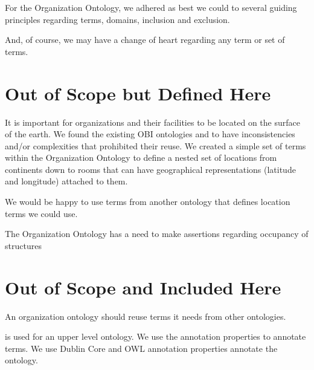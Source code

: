\documentclass[letterpaper,10pt,english]{sphinxmanual}
\begin{document}
\sphinxAtStartPar
For the Organization Ontology, we adhered as best we could to several guiding principles
regarding terms, domains, inclusion and exclusion.

\sphinxAtStartPar
And, of course, we may have a change of heart regarding any term or set of terms.


\section{Out of Scope but Defined Here}
\label{\detokenize{out-of-scope:out-of-scope-but-defined-here}}
\begin{sphinxShadowBox}

\sphinxAtStartPar
It is important for organizations and their facilities to be located on the surface of
the earth.  We found the existing OBI ontologies  and  to have
inconsistencies
and/or complexities that prohibited their reuse.  We created a simple  set of terms
within
the Organization Ontology to define a nested set of locations from continents down
to rooms that can have geographical representations (latitude and longitude) attached
to them.

\sphinxAtStartPar
We would be happy to use terms from another ontology that defines location terms we
could use.
\end{sphinxShadowBox}

\begin{sphinxShadowBox}

\sphinxAtStartPar
The Organization Ontology has a need to make assertions regarding occupancy of
structures
\end{sphinxShadowBox}


\section{Out of Scope and Included Here}
\label{\detokenize{out-of-scope:out-of-scope-and-included-here}}
\sphinxAtStartPar
An organization ontology should reuse terms it needs from other ontologies.

\begin{sphinxShadowBox}

\sphinxAtStartPar
{} is used for an upper level ontology.  We use the  annotation properties to
annotate terms.  We use Dublin Core and OWL annotation properties annotate the
ontology.
\end{sphinxShadowBox}
\end{document}
